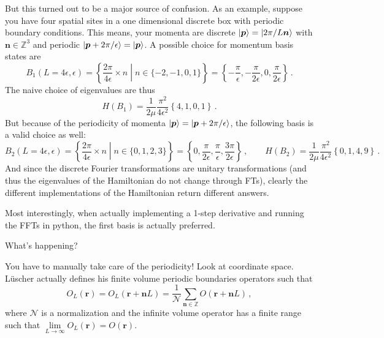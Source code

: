 \documentclass[
    aps,
    prl,
    showkeys,
    nofootinbib,
    floatfix
]{revtex4-1}
\renewcommand{\vec}[1]{\boldsymbol{#1}}
\begin{document}
But this turned out to be a major source of confusion.
As an example, suppose you have four spatial sites in a one dimensional discrete box with periodic boundary conditions.
This means, your momenta are discrete $\ket{\vec p} = \ket{2 \pi / L \vec n}$ with $\vec n \in \mathbb Z^3$ and periodic  $\ket{\vec p + 2 \pi / \epsilon} = \ket{\vec p}$.
A possible choice for momentum basis states are
\begin{equation}
	B_1(L = 4\epsilon, \epsilon)
	= \left\{ \frac{2\pi}{4\epsilon} \times n \middle \vert n \in \{-2, -1, 0, 1\} \right\}
	= \left\{ -\frac{\pi}{\epsilon}, -\frac{\pi}{2\epsilon}, 0, \frac{\pi}{2\epsilon} \right\} \, .
\end{equation}
The naive choice of eigenvalues are thus
\begin{equation}
    H(B_1) = \frac{1}{2\mu} \frac{\pi^2}{4 \epsilon^2} \left\{ 4, 1, 0, 1\right\} \, .
\end{equation}
But because of the periodicity of momenta $\ket{\vec p} = \ket{\vec p + 2\pi/\epsilon}$, the following basis is a valid choice as well:
\begin{equation}
	B_2(L = 4\epsilon, \epsilon)
	= \left\{ \frac{2\pi}{4\epsilon} \times n \middle \vert n \in \{0, 1, 2, 3\} \right\}
	= \left\{ 0, \frac{\pi}{2\epsilon}, \frac{\pi}{\epsilon}, \frac{3\pi}{2\epsilon} \right\} \, , \qquad
	H(B_2) = \frac{1}{2\mu} \frac{\pi^2}{4 \epsilon^2} \left\{ 0, 1, 4, 9\right\} \, .
\end{equation}
And since the discrete Fourier transformations are unitary transformations (and thus the eigenvalues of the Hamiltonian do not change through FTs), clearly the different implementations of the Hamiltonian return different answers.

Most interestingly, when actually implementing a 1-step derivative and running the FFTs in python, the first basis is actually preferred.

What's happening?

You have to manually take care of the periodicity!
Look at coordinate space.
Lüscher actually defines his finite volume periodic boundaries operators such that
\begin{equation}
    O_L(\vec r) = O_L(\vec r + \vec n L) = \frac{1}{\mathcal N} \sum _{\vec n \in \mathbb Z} O(\vec r + \vec n L)\, ,
\end{equation}
where $\mathcal N$ is a normalization and the infinite volume operator has a finite range such that $\lim\limits_{L\to \infty} O_L(\vec r) = O(\vec r)$.
\end{document}
